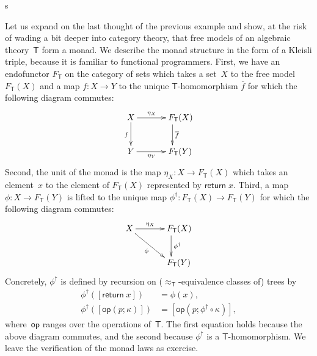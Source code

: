 s\documentclass{amsart}
\newcommand{\theory}[1]{\mathsf{#1}} %
\newcommand{\Free}[2]{F_{\theory{#1}}(#2)} %
\newcommand{\FreeFun}[1]{F_{\theory{#1}}} %
\newcommand{\lift}[1]{#1^\dagger} %
\newcommand{\kode}[1]{\mathsf{#1}}
\newcommand{\opcall}[3]{\kode{#1}(#2; #3)}
\newcommand{\return}[1]{\kode{return}\;#1}
\begin{document}
Let us expand on the last thought of the previous example and show, at the risk
of wading a bit deeper into category theory, that free models of an algebraic
theory~$\theory{T}$ form a monad. We describe the monad structure in the form of
a Kleisli triple, because it is familiar to functional programmers. First, we
have an endofunctor $\FreeFun{T}$ on the category of sets which takes a set~$X$
to the free model $\Free{T}{X}$ and a map $f : X \to Y$ to the unique
$\theory{T}$-homomorphism $\overline{f}$ for which the following diagram
commutes:
%
\begin{equation*}
  \xymatrix{
    {X}
    \ar[r]^{\eta_X}
    \ar[d]_{f}
    &
    **[r]{\Free{T}{X}}
    \ar[d]^{\overline{f}}
    \\
    {Y}
    \ar[r]_{\eta_Y}
    &
    **[r]{\Free{T}{Y}}
  }
\end{equation*}
%
Second, the unit of the monad is the map $\eta_X : X \to \Free{T}{X}$ which
takes an element~$x$ to the element of $\Free{T}{X}$ represented by
$\return{x}$. Third, a map $\phi : X \to \Free{T}{Y}$ is lifted to the unique map
$\lift{\phi} : \Free{T}{X} \to \Free{T}{Y}$ for which the following diagram commutes:
%
\begin{equation*}
  \xymatrix{
    {X}
    \ar[r]^{\eta_X}
    \ar[rd]_{\phi}
    &
    **[r]{\Free{T}{X}}
    \ar[d]^{\lift{\phi}}
    \\
    &
    **[r]{\Free{T}{Y}}
  }
\end{equation*}
%
Concretely, $\lift{\phi}$ is defined by recursion on
($\approx_{\theory{T}}$-equivalence classes of) trees by
%
\begin{align*}
  \lift{\phi}([\return{x}]) &= \phi(x), \\
  \lift{\phi}([\opcall{op}{p}{\kappa}]) &= [\opcall{op}{p}{\lift{\phi} \circ \kappa}],
\end{align*}
%
where~$\kode{op}$ ranges over the operations of~$\theory{T}$. The first equation
holds because the above diagram commutes, and the second because $\lift{\phi}$ is a
$\theory{T}$-homomorphism. We leave the verification of the monad laws as
exercise.
\end{document}

